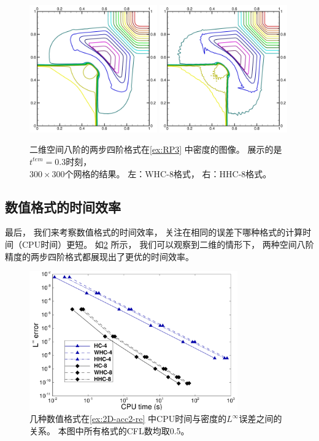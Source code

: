 \begin{figure}[htbp]
  \centering
  \includegraphics[width=0.49\textwidth]{fig/2D/RP15_S2O4-WHC8_CFL0.500000.pdf}
  \includegraphics[width=0.49\textwidth]{fig/2D/RP15_S2O4-HHC8theta200000_CFL0.500000.pdf}
  \caption{二维空间八阶的两步四阶格式在\cref{ex:RP3} 中密度的图像。
    展示的是$t^{tem}=0.3$时刻，
    \\$300 \times 300$个网格的结果。
    左：WHC-8格式，
    右：HHC-8格式。
  }
  \label{fig:RP3-8}
\end{figure}

\subsection{数值格式的时间效率}

最后，
我们来考察数值格式的时间效率，
关注在相同的误差下哪种格式的计算时间（CPU时间）更短。
如\cref{fig:2D-time} 所示，
我们可以观察到二维的情形下，
两种空间八阶精度的两步四阶格式都展现出了更优的时间效率。

\begin{figure}[htbp]
  \centering
  \includegraphics[width=0.8\textwidth]{fig/Time/Time-2D.pdf}
  \caption{几种数值格式在\cref{ex:2D-acc2-re} 中CPU时间与密度的$L^\infty$误差之间的关系。
    本图中所有格式的CFL数均取0.5。
  }
  \label{fig:2D-time}
\end{figure}

